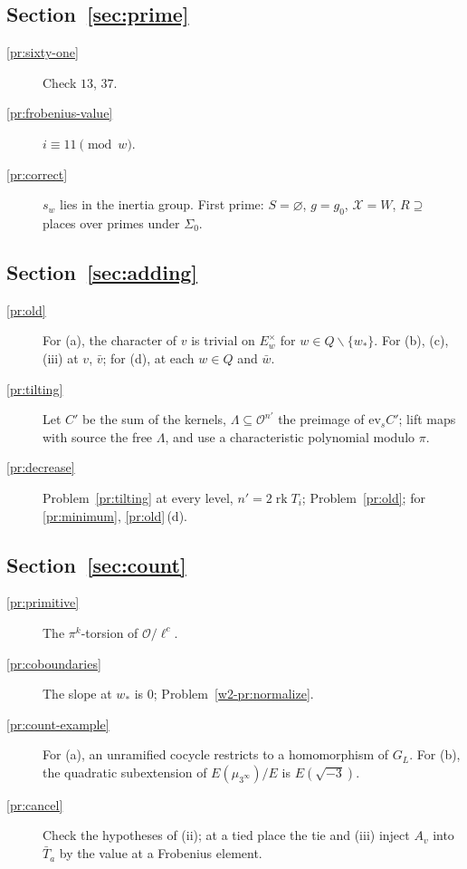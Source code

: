 \documentclass[reqno]{amsart}
\theoremstyle{definition}
\theoremstyle{plain}
\newcommand{\Oc}{\mathcal{O}}
\newcommand{\rk}{\operatorname{rk}}
\newcommand{\ev}{\mathrm{ev}}
\newcommand{\Xc}{\mathcal{X}}
\begin{document}
\subsection*{Section~\ref{sec:prime}}
\begin{description}
\item[\ref{pr:sixty-one}] Check \(13\), \(37\).
\item[\ref{pr:frobenius-value}] \(i \equiv 11 \pmod w\).
\item[\ref{pr:correct}] \(s_w\) lies in the inertia group.  First prime: \(S = \varnothing\), \(g = g_0\), \(\Xc = W\), \(R \supseteq\) places over primes under \(\Sigma_0\).
\end{description}

\subsection*{Section~\ref{sec:adding}}
\begin{description}
\item[\ref{pr:old}] For (a), the character of \(v\) is trivial on \(E_w^\times\) for \(w \in Q \smallsetminus \{w_*\}\).  For (b), (c), (iii) at \(v\), \(\bar v\); for (d), at each \(w \in Q\) and \(\bar w\).
\item[\ref{pr:tilting}] Let \(C'\) be the sum of the kernels, \(\Lambda \subseteq \Oc^{n'}\) the preimage of \(\ev_s C'\); lift maps with source the free \(\Lambda\), and use a characteristic polynomial modulo \(\pi\).
\item[\ref{pr:decrease}] Problem~\ref{pr:tilting} at every level, \(n' = 2\rk T_i\); Problem~\ref{pr:old}; for \ref{pr:minimum}, \ref{pr:old}\,(d).
\end{description}

\subsection*{Section~\ref{sec:count}}
\begin{description}
\item[\ref{pr:primitive}] The \(\pi^k\)-torsion of \(\Oc/\ell^c\).
\item[\ref{pr:coboundaries}] The slope at \(w_*\) is \(0\); Problem~\ref{w2-pr:normalize}.
\item[\ref{pr:count-example}] For (a), an unramified cocycle restricts to a homomorphism of \(G_L\).  For (b), the quadratic subextension of \(E(\mu_{3^\infty})/E\) is \(E(\sqrt{-3})\).
\item[\ref{pr:cancel}] Check the hypotheses of (ii); at a tied place the tie and (iii) inject \(A_v\) into \(\bar T_a\) by the value at a Frobenius element.
\end{description}
\end{document}
